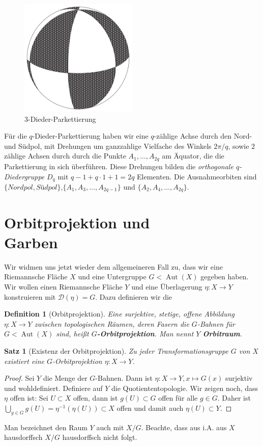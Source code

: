 \documentclass[12pt,a4paper]{article}
\theoremstyle{plain}
\newtheorem{Satz}[Theorem]{Satz}
\newtheorem{Definition}[Theorem]{Definition}
\newcommand{\herv}[1]{{\emph{\textbf{#1}}}}
\numberwithin{equation}{section}
\begin{document}
\begin{figure} \includegraphics[width=0.5\textwidth]{Dieder.png}
\caption{$3$-Dieder-Parkettierung}
\end{figure}\noindent Für die $q$-Dieder-Parkettierung haben wir eine $q$-zählige Achse durch den Nord- und Südpol, mit Drehungen um ganzzahlige Vielfache des Winkels $2\pi/q$, sowie $2$ zählige Achsen durch durch die Punkte $A_1,\ldots,A_{2q}$ am Äquator, die die Parkettierung in sich überführen. Diese Drehungen bilden die \emph{orthogonale $q$-Diedergruppe} $D_q$ mit $q-1+q\cdot 1+1=2q$ Elementen. Die Ausnahmeorbiten sind \linebreak $\{\textit{Nordpol}, \textit{Südpol}\}$,$\{A_1,A_3,\ldots,A_{2q-1}\}$ und \linebreak $\{A_2,A_4,\ldots,A_{2q}\}$.

\section{Orbitprojektion und \\Garben}
Wir widmen uns jetzt wieder dem allgemeineren Fall zu, dass wir eine Riemannsche Fläche $X$ und eine Untergruppe $G < \operatorname{Aut}(X)$ gegeben haben. Wir wollen einen Riemannsche Fläche $Y$ und eine Überlagerung $\eta: X\rightarrow Y$ konstruieren mit $\mathcal{D}(\eta) = G$. Dazu definieren wir die
\begin{Definition}[Orbitprojektion] Eine surjektive, stetige, offene Abbildung $\eta:X\rightarrow Y$ zwischen topologischen Räumen, deren Fasern die $G$-Bahnen für $G < \operatorname{Aut}(X)$ sind, heißt \herv{$G$-Orbitprojektion}. Man nennt $Y$ \herv{Orbitraum}.
\end{Definition}

\begin{Satz}[Existenz der Orbitprojektion] Zu jeder Transformationsgruppe $G$ von $X$ existiert eine $G$-Orbitprojektion $\eta:X\rightarrow Y$.
\end{Satz}
\begin{proof}
Sei $Y$ die Menge der $G$-Bahnen. Dann ist $\eta: X\rightarrow Y, x\mapsto G(x)$ surjektiv und wohldefiniert. Definiere auf $Y$ die Quotiententopologie. Wir zeigen noch, dass $\eta$ offen ist: Sei  $U\subset X$ offen, dann ist $g(U)\subset G$ offen für alle $g\in G$. Daher ist $\bigcup_{g\in G} g(U) = \eta^{-1}(\eta(U))\subset X$ offen und damit auch $\eta(U)\subset Y$.
\end{proof}
Man bezeichnet den Raum $Y$ auch mit $X/G$. Beachte, dass aus i.A. aus $X$ hausdorffsch $X/G$ hausdorffsch nicht folgt.
\end{document}
